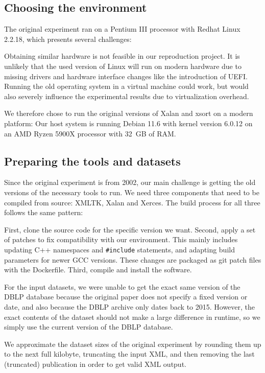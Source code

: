 \documentclass[sigconf,nonacm]{acmart}
\begin{document}
\subsection{Choosing the environment}

The original experiment ran on a Pentium III processor with Redhat Linux 2.2.18\cite{XMLTK}, which presents several challenges:

Obtaining similar hardware is not feasible in our reproduction project. It is unlikely that the used version of Linux will run on modern hardware due to missing drivers and hardware interface changes like the introduction of UEFI. Running the old operating system in a virtual machine could work, but would also severely influence the experimental results due to virtualization overhead.

We therefore chose to run the original versions of Xalan and xsort on a modern platform: Our host system is running Debian 11.6 with kernel version 6.0.12 on an AMD Ryzen 5900X processor with 32 GB of RAM.


\subsection{Preparing the tools and datasets}

Since the original experiment is from 2002, our main challenge is getting the old versions of the necessary tools to run. We need three components that need to be compiled from source: XMLTK, Xalan and Xerces. The build process for all three follows the same pattern:

First, clone the source code for the specific version we want. Second, apply a set of patches to fix compatibility with our environment. This mainly includes updating C++ namespaces and \lstinline{#include} statements, and adapting build parameters for newer GCC versions. These changes are packaged as git patch files with the Dockerfile. Third, compile and install the software.

For the input datasets, we were unable to get the exact same version of the DBLP database because the original paper does not specify a fixed version or date, and also because the DBLP archive only dates back to 2015. However, the exact contents of the dataset should not make a large difference in runtime, so we simply use the current version of the DBLP database.\cite{DBLP-current}

We approximate the dataset sizes of the original experiment by rounding them up to the next full kilobyte, truncating the input XML, and then removing the last (truncated) publication in order to get valid XML output.
\end{document}
